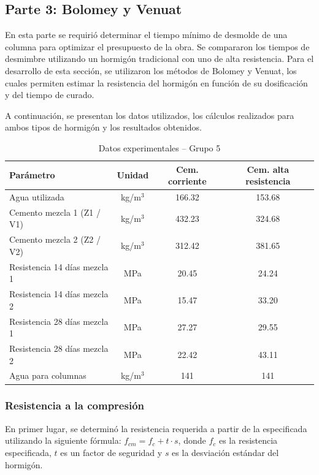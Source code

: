 \subsection*{Parte 3: Bolomey y Venuat}

En esta parte se requirió determinar el tiempo mínimo de desmolde de una columna para optimizar el presupuesto de la obra. Se compararon los tiempos de desmimbre utilizando un hormigón tradicional con uno de alta resistencia. 
Para el desarrollo de esta sección, se utilizaron los métodos de Bolomey y Venuat, los cuales permiten estimar la resistencia del hormigón en función de su dosificación y del tiempo de curado.

A continuación, se presentan los datos utilizados, los cálculos realizados para ambos tipos de hormigón y los resultados obtenidos.

\begin{table}[H]
\centering
\caption{Datos experimentales – Grupo 5}
\renewcommand{\arraystretch}{1.15}
\small
\begin{tabular}{lccc}
\hline
\textbf{Parámetro} & \textbf{Unidad} & \textbf{Cem. corriente} & \textbf{Cem. alta resistencia} \\ \hline
Agua utilizada & kg/m$^3$ & 166.32 & 153.68 \\
Cemento mezcla 1 (Z1 / V1) & kg/m$^3$ & 432.23 & 324.68 \\
Cemento mezcla 2 (Z2 / V2) & kg/m$^3$ & 312.42 & 381.65 \\
Resistencia 14 días mezcla 1 & MPa & 20.45 & 24.24 \\
Resistencia 14 días mezcla 2 & MPa & 15.47 & 33.20 \\
Resistencia 28 días mezcla 1 & MPa & 27.27 & 29.55 \\
Resistencia 28 días mezcla 2 & MPa & 22.42 & 43.11 \\
Agua para columnas & kg/m$^3$ & 141 & 141\\ \hline
\end{tabular}
\end{table}

\subsubsection*{Resistencia a la compresión}

En primer lugar, se determinó la resistencia requerida a partir de la especificada utilizando la siguiente fórmula: $f_{cm} = f_c + t \cdot s$, donde $f_c$ es la resistencia especificada, $t$ es un factor de seguridad y $s$ es la desviación estándar del hormigón.


